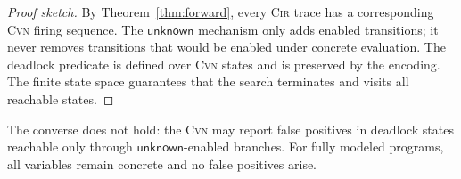 \begin{proof}[Proof sketch]
By Theorem~\ref{thm:forward}, every \textsc{Cir} trace has a
corresponding \textsc{Cvn} firing sequence. The $\mathsf{unknown}$ mechanism only adds enabled transitions; it never removes transitions that would be enabled under
concrete evaluation. The deadlock predicate is defined over
\textsc{Cvn} states and is preserved by the encoding. The finite state space guarantees that the search terminates and visits all reachable states.
\end{proof}

The converse does not hold: the \textsc{Cvn} may report false
positives in deadlock states reachable only through
$\mathsf{unknown}$-enabled branches. For fully modeled programs, all
variables remain concrete and no false positives arise.
